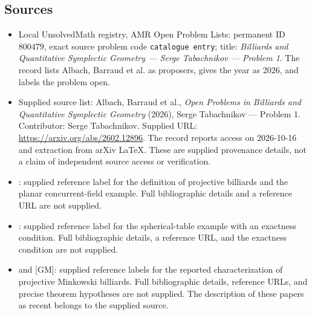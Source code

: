\documentclass[11pt]{article}
\begin{document}
\subsection{Sources}
\begin{itemize}
\item Local UnsolvedMath registry, AMR Open Problem Lists: permanent ID \(800479\), exact source problem code \texttt{catalogue entry}; title: \emph{Billiards and Quantitative Symplectic Geometry --- Serge Tabachnikov --- Problem 1}. The record lists Albach, Barraud et al. as proposers, gives the year as 2026, and labels the problem open.
\item Supplied source list: Albach, Barraud et al., \emph{Open Problems in Billiards and Quantitative Symplectic Geometry} (2026), Serge Tabachnikov --- Problem 1. Contributor: Serge Tabachnikov. Supplied URL: \url{https://arxiv.org/abs/2602.12896}. The record reports access on 2026-10-16 and extraction from arXiv LaTeX. These are supplied provenance details, not a claim of independent source access or verification.
\item [Ta97]: supplied reference label for the definition of projective billiards and the planar concurrent-field example. Full bibliographic details and a reference URL are not supplied.
\item [Ta97-1]: supplied reference label for the spherical-table example with an exactness condition. Full bibliographic details, a reference URL, and the exactness condition are not supplied.
\item [Glu] and [GM]: supplied reference labels for the reported characterization of projective Minkowski billiards. Full bibliographic details, reference URLs, and precise theorem hypotheses are not supplied. The description of these papers as recent belongs to the supplied source.
\end{itemize}
\end{document}
